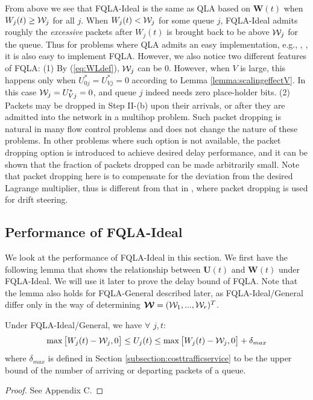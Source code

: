 \documentclass[journal]{IEEEtran}
\newcommand{\bv}[1]{{\boldsymbol{#1} }}
\newcommand{\script}[1]{{{\cal{#1} }}}
\begin{document}
From above we see that FQLA-Ideal is the same as QLA based on $\bv{W}(t)$ when $W_j(t)\geq \script{W}_j$ for all $j$. When $W_j(t)< \script{W}_j$ for some queue $j$, FQLA-Ideal admits roughly the \emph{excessive} packets after $W_j(t)$ is brought back to be above $\script{W}_j$ for the queue. Thus for problems where QLA admits an easy implementation, e.g., \cite{neelyenergy}, \cite{huangneelypricing}, it is also easy to implement FQLA. 
However,  we also notice two different features of FQLA: (1) By (\ref{eq:WLdef}), $\script{W}_j$ can be $0$. However, when $V$ is large, this happens only when $U^*_{0j}=U^*_{Vj}=0$ according to Lemma \ref{lemma:scalingeffectV}. In this case $\script{W}_j=U^*_{Vj}=0$, and queue $j$ indeed needs zero place-holder bits.  (2) Packets may be dropped in Step II-(b) upon their arrivals, or after they are admitted into the network in a multihop problem. Such packet dropping is natural in many flow control problems and does not change the nature of these problems. In other problems where such option is not available, the packet dropping option is introduced to achieve desired delay performance, and it can be shown that the fraction of packets dropped can be made arbitrarily small.  Note that packet dropping here is to compensate for the deviation from the desired Lagrange multiplier, thus is different from that in \cite{neelypktdrop}, where packet dropping is used for drift steering. %

 
\vspace{-.1in}
\subsection{Performance of FQLA-Ideal}
We look at the performance of FQLA-Ideal in this section. We first have the following lemma that shows the relationship between $\bv{U}(t)$ and $\bv{W}(t)$ under FQLA-Ideal. We will use it later to prove the delay bound of FQLA. Note that the lemma also holds for FQLA-General described later, as FQLA-Ideal/General differ only in the way of determining $\bv{\script{W}}=(\script{W}_1, ..., \script{W}_r)^T$.\begin{lemma}\label{lemma:UtWt}
Under FQLA-Ideal/General, we have $\forall\,\, j, t$:
\begin{equation}
\max\big[W_j(t)-\script{W}_j,0\big]\leq U_j(t)\leq\max\big[W_j(t)-\script{W}_j,0\big]+\delta_{max}\label{eq:UWrelation}
\end{equation}
where $\delta_{max}$ is defined in Section \ref{subsection:costtrafficservice} to be the upper bound of the number of arriving or departing packets of a queue. 
\end{lemma}
\begin{proof}
See Appendix C.
\end{proof}
\end{document}
